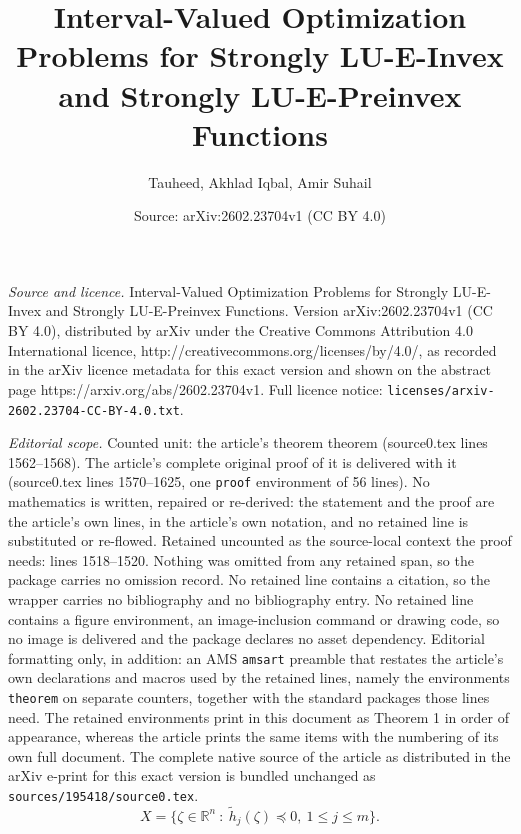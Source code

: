 \documentclass[10pt,a4paper]{amsart}
\title{Interval-Valued Optimization Problems for Strongly LU-E-Invex and Strongly LU-E-Preinvex Functions}
\author{Tauheed, Akhlad Iqbal, Amir Suhail}
\date{Source: arXiv:2602.23704v1 (CC BY 4.0)}
\begin{document}
\maketitle

\noindent\emph{Source and licence.} Interval-Valued Optimization Problems for Strongly LU-E-Invex and Strongly LU-E-Preinvex Functions. Version arXiv:2602.23704v1 (CC BY 4.0), distributed by arXiv under the Creative Commons Attribution 4.0 International licence, http://creativecommons.org/licenses/by/4.0/, as recorded in the arXiv licence metadata for this exact version and shown on the abstract page https://arxiv.org/abs/2602.23704v1. Full licence notice: \texttt{licenses/arxiv-2602.23704-CC-BY-4.0.txt}.\par\smallskip

\noindent\textit{Editorial scope.} Counted unit: the article's theorem theorem (source0.tex lines 1562--1568). The article's complete original proof of it is delivered with it (source0.tex lines 1570--1625, one \texttt{proof} environment of 56 lines). No mathematics is written, repaired or re-derived: the statement and the proof are the article's own lines, in the article's own notation, and no retained line is substituted or re-flowed.  Retained uncounted as the source-local context the proof needs: lines 1518--1520.  Nothing was omitted from any retained span, so the package carries no omission record.  No retained line contains a citation, so the wrapper carries no bibliography and no bibliography entry.  No retained line contains a figure environment, an image-inclusion command or drawing code, so no image is delivered and the package declares no asset dependency.  Editorial formatting only, in addition: an AMS \texttt{amsart} preamble that restates the article's own declarations and macros used by the retained lines, namely the environments \texttt{theorem} on separate counters, together with the standard packages those lines need.  The retained environments print in this document as Theorem 1 in order of appearance, whereas the article prints the same items with the numbering of its own full document.  The complete native source of the article as distributed in the arXiv e-print for this exact version is bundled unchanged as \texttt{sources/195418/source0.tex}.
       \begin{equation}\label{4.2} 
          {X}=\big\{\mathit{\zeta} \in\mathbb{R}^{n}~:~\tilde{h}_{j}(\mathit{\zeta} )\preceq 0,~1\leq j\leq m\big\}.
       \end{equation} 
\end{document}
